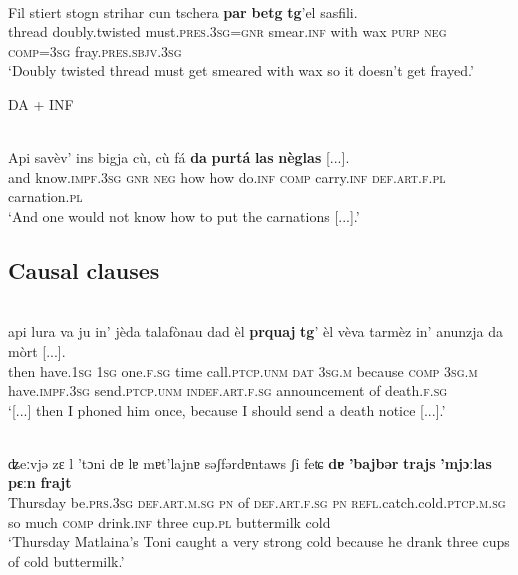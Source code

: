 \ea\label{}
\\
\gll   Fil stiert stogn strihar cun tschera \textbf{par} \textbf{betg} \textbf{tg}’el sasfili.\\
     thread doubly.twisted must.\textsc{pres.3sg=gnr} smear.\textsc{inf} with wax \textsc{purp} \textsc{neg} \textsc{comp=3sg} fray.\textsc{pres.sbjv.3sg}\\
\glt `Doubly twisted thread must get smeared with wax so it doesn’t get frayed.'
\z

DA + INF

\ea\label{}
\\
	\gll    Api savèv’ ins bigja cù, cù fá \textbf{da} \textbf{purtá} \textbf{las} \textbf{nèglas} [...].\\
and know.\textsc{impf.3sg} \textsc{gnr} \textsc{neg} how how do.\textsc{inf} \textsc{comp} carry.\textsc{inf} \textsc{def.art.f.pl} carnation.\textsc{pl} \\
\glt `And one would not know how to put the carnations [...].'
\z




\subsection{Causal clauses}

 
 
\ea
\label{}
\\ 
\gll  [...] api lura va ju in’ jèda talafònau dad èl \textbf{prquaj} \textbf{tg}' èl vèva tarmèz in’ anunzja da mòrt [...].\\
then have.\textsc{1sg}  \textsc{1sg} one.\textsc{f.sg} time call.\textsc{ptcp.unm} \textsc{dat} \textsc{3sg.m} because \textsc{comp} \textsc{3sg.m} have.\textsc{impf.3sg} send.\textsc{ptcp.unm} \textsc{indef.art.f.sg} announcement of death.\textsc{f.sg}\\ 
\glt `[...] then I phoned him once, because I should send a death notice [...].'
\z
 
 
 \ea\label{ex:1:}
 {\citealt[9]{Valär2013b}}\\
\gll ʥeːvjǝ zɛ l 'tɔni dɐ lɐ mɐt'lajnɐ sǝʃfǝrdɐntaws ʃi feʨ \textbf{dɐ} \textbf{'bajbǝr} \textbf{trajs} \textbf{'mjɔːlas} \textbf{pɛːn} \textbf{frajt} \\
 Thursday  be.\textsc{prs.3sg}  \textsc{def.art.m.sg} \textsc{pn} of \textsc{def.art.f.sg} \textsc{pn} \textsc{refl}.catch.cold.\textsc{ptcp.m.sg} so much \textsc{comp} drink.\textsc{inf} three cup.\textsc{pl}  buttermilk cold  \\
\glt `Thursday Matlaina’s Toni caught a very strong cold because he drank three cups of cold buttermilk.'
\z


